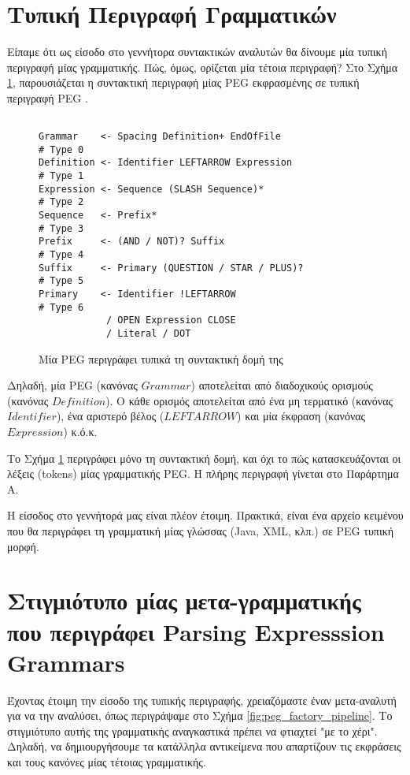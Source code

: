 \section{Τυπική Περιγραφή Γραμματικών}
Είπαμε ότι ως είσοδο στο γεννήτορα συντακτικών αναλυτών θα δίνουμε μία τυπική περιγραφή μίας γραμματικής. 
Πώς, όμως, ορίζεται μία τέτοια περιγραφή? Στο Σχήμα \ref{fig:peg_specification}, παρουσιάζεται η συντακτική περιγραφή μίας PEG εκφρασμένης σε τυπική περιγραφή PEG \cite{lgi}.

\begin{figure}[h]
\begin{Verbatim}

Grammar    <- Spacing Definition+ EndOfFile                     # Type 0
Definition <- Identifier LEFTARROW Expression                   # Type 1
Expression <- Sequence (SLASH Sequence)*                        # Type 2
Sequence   <- Prefix*                                           # Type 3
Prefix     <- (AND / NOT)? Suffix                               # Type 4
Suffix     <- Primary (QUESTION / STAR / PLUS)?                 # Type 5
Primary    <- Identifier !LEFTARROW                             # Type 6
            / OPEN Expression CLOSE
            / Literal / DOT
\end{Verbatim}
\caption{Μία PEG περιγράφει τυπικά τη συντακτική δομή της}
\label{fig:peg_specification}
\end{figure}

Δηλαδή, μία PEG (κανόνας $Grammar$) αποτελείται από διαδοχικούς ορισμούς (κανόνας $Definition$). 
Ο κάθε ορισμός αποτελείται από ένα μη τερματικό (κανόνας $Identifier$), ένα αριστερό βέλος ($LEFTARROW$) και μία έκφραση (κανόνας $Expression$) κ.ό.κ.

Το Σχήμα \ref{fig:peg_specification} περιγράφει μόνο τη συντακτική δομή, και όχι το πώς κατασκευάζονται οι λέξεις (tokens) μίας γραμματικής PEG.
H πλήρης περιγραφή γίνεται στο Παράρτημα Α.

Η είσοδος στο γεννήτορά μας είναι πλέον έτοιμη. 
Πρακτικά, είναι ένα αρχείο κειμένου που θα περιγράφει τη γραμματική μίας γλώσσας (Java, XML, κλπ.) σε PEG τυπική μορφή.

\section{Στιγμιότυπο μίας μετα-γραμματικής που περιγράφει Parsing Expresssion Grammars}

Έχοντας έτοιμη την είσοδο της τυπικής περιγραφής, χρειαζόμαστε έναν μετα-αναλυτή για να την αναλύσει, όπως περιγράψαμε στο Σχήμα \ref{fig:peg_factory_pipeline}. 
Το στιγμιότυπο αυτής της γραμματικής αναγκαστικά πρέπει να φτιαχτεί "με το χέρι".
Δηλαδή, να δημιουργήσουμε τα κατάλληλα αντικείμενα που απαρτίζουν τις εκφράσεις και τους κανόνες μίας τέτοιας γραμματικής.

